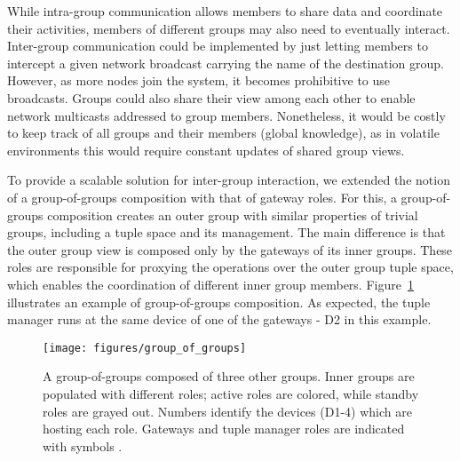 


While intra-group communication allows members to share data and coordinate their activities, members of different groups may also need to eventually interact. Inter-group communication could be implemented by just letting members to intercept a given network broadcast carrying the name of the destination group. However, as more nodes join the system, it becomes prohibitive to use broadcasts. Groups could also share their view among each other to enable network multicasts addressed to group members. Nonetheless, it would be costly to keep track of all groups and their members (global knowledge), as in volatile environments this would require constant updates of shared group views.

To provide a scalable solution for inter-group interaction, we extended the notion of a group-of-groups composition with that of gateway roles. For this, a group-of-groups composition creates an outer group with similar properties of trivial groups, including a tuple space and its management. The main difference is that the outer group view is composed only by the gateways of its inner groups. These roles are responsible for proxying the operations over the  outer group tuple space, which enables the coordination of different inner group members. Figure~\ref{fig:group_of_groups} illustrates an example of group-of-groups composition. As expected, the tuple manager runs at the same device of one of the gateways - D2 in this example.


\begin{figure}[t!]
	\centering
	\texttt{[image: figures/group\_of\_groups]}
	\caption{A group-of-groups composed of three other groups. Inner groups are populated with different roles; active roles are colored, while standby roles are grayed out. Numbers identify the devices (D1-4) which are hosting each role. Gateways and tuple manager roles are indicated with symbols .}
	\label{fig:group_of_groups}
\end{figure}

